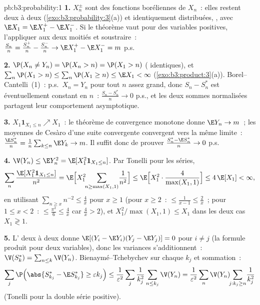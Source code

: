 \begin{solution}{pb:b3:probability:1}
\textbf{1.} $X_n^{\pm}$ sont des fonctions boréliennes de
$X_n$~: elles restent deux à deux 
(\cref{exo:b3:probability:3}(a)) et identiquement
distribuées, , avec $\E X_1 = \E X_1^+ - \E
X_1^-$. Si le théorème vaut pour des variables positives,
l'appliquer aux deux moitiés et soustraire~:
$\frac{S_n}n = \frac{S_n^+}n - \frac{S_n^-}n \to \E X_1^+
- \E X_1^- = m$ p.s.

\textbf{2.} $\P(X_n \neq Y_n) = \P(X_n > n) = \P(X_1 > n)$
( identiques), et $\sum_n\P(X_1 > n) \leq
\sum_n\P(X_1 \geq n) \leq \E X_1 < \infty$
(\cref{exo:b3:product:3}(a)). Borel--Cantelli~(1)~: p.s.\
$X_n = Y_n$ pour tout $n$ assez grand, donc $S_n - S_n^*$
est éventuellement constant en $n$~: $\frac{S_n -
S_n^*}n \to 0$ p.s., et les deux sommes normalisées
partagent leur comportement asymptotique.

\textbf{3.} $X_1\mathbf 1_{X_1 \leq n} \nearrow X_1$~: le
théorème de convergence monotone donne $\E Y_n \to m$~; les
moyennes de Cesàro d'une suite convergente convergent vers
la même limite~: $\frac{\E S_n^*}n =
\frac1n\sum_{k\leq n}\E Y_k \to m$. Il suffit donc de
prouver $\frac{S^*_n - \E S^*_n}{n} \to 0$ p.s.

\textbf{4.} $\V(Y_n) \leq \E Y_n^2 = \E[X_1^2\mathbf
1_{X_1\leq n}]$. Par Tonelli pour les séries,
\[
\sum_n\frac{\E[X_1^2\mathbf 1_{X_1\leq n}]}{n^2}
= \E\Bigl[X_1^2\!\!\sum_{n \geq \max(X_1, 1)}\!\frac1{n^2}
\Bigr]
\leq \E\Bigl[X_1^2\cdot\frac{4}{\max(X_1,1)}\Bigr]
\leq 4\,\E[X_1] < \infty,
\]
en utilisant $\sum_{n\geq x}n^{-2} \leq \frac4x$ pour $x
\geq 1$ (pour $x \geq 2$~: $\leq \frac1{x-1} \leq
\frac2x$~; pour $1 \leq x < 2$~: $\leq \frac{\pi^2}6 \leq
\frac4x$ car $\frac4x > 2$), et $X_1^2/\max(X_1, 1) \leq
X_1$ dans les deux cas $X_1 \gtrless 1$.

\textbf{5.} L' deux à deux donne $\E[(Y_i -
\E Y_i)(Y_j - \E Y_j)] = 0$ pour $i \neq j$ (la formule
produit pour deux variables), donc les variances
s'additionnent~: $\V(S^*_k) = \sum_{n\leq k}\V(Y_n)$.
Bienaymé--Tchebychev sur chaque $k_j$ et sommation~:
\[
\sum_j\P\Bigl(\abs{S^*_{k_j} - \E S^*_{k_j}} \geq
\varepsilon k_j\Bigr)
\leq \frac1{\varepsilon^2}\sum_j\frac1{k_j^2}\sum_{n\leq
k_j}\V(Y_n)
= \frac1{\varepsilon^2}\sum_n\V(Y_n)\!\!\sum_{j : k_j\geq
n}\!\frac1{k_j^2}
\]
(Tonelli pour la double série positive).


\end{solution}
